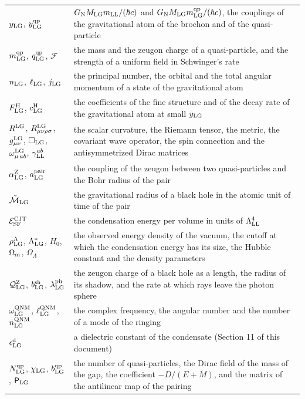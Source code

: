 \documentclass[
  10pt,
]{article}
\begin{document}
\begin{longtable}[]{@{}
  >{\raggedright\arraybackslash}p{}
  >{\raggedright\arraybackslash}p{}@{}}
\(y_{\rm LG}\), \(y^{\rm qp}_{\rm LG}\) &
\(G_{\rm N}M_{\rm LG}m_{\rm LL}/(\hbar c)\) and
\(G_{\rm N}M_{\rm LG}m^{\rm qp}_{\rm LG}/(\hbar c)\), the couplings of
the gravitational atom of the brochon and of the quasi-particle \\
\(m^{\rm qp}_{\rm LG}\), \(q^{\rm qp}_{\rm LG}\), \(\mathcal F\) & the
mass and the zeugon charge of a quasi-particle, and the strength of a
uniform field in Schwinger's rate \\
\(n_{\rm LG}\), \(\ell_{\rm LG}\), \(j_{\rm LG}\) & the principal
number, the orbital and the total angular momentum of a state of the
gravitational atom \\
\(F^{\rm H}_{\rm LG}\), \(c^{\rm H}_{\rm LG}\) & the coefficients of the
fine structure and of the decay rate of the gravitational atom at small
\(y_{\rm LG}\) \\
\(R^{\rm LG}\), \(R^{\rm LG}_{\mu\nu\rho\sigma}\),
\(g^{\rm LG}_{\mu\nu}\), \(\Box_{\rm LG}\),
\(\omega^{\rm LG}_{\mu\,ab}\), \(\gamma^{ab}_{\rm LL}\) & the scalar
curvature, the Riemann tensor, the metric, the covariant wave operator,
the spin connection and the antisymmetrized Dirac matrices \\
\(\alpha^{\rm Z}_{\rm LG}\), \(a^{\rm pair}_{\rm LG}\) & the coupling of
the zeugon between two quasi-particles and the Bohr radius of the
pair \\
\(\tilde{\mathcal M}_{\rm LG}\) & the gravitational radius of a black
hole in the atomic unit of time of the pair \\
\(\mathcal E^{\rm CJT}_{\rm SF}\) & the condensation energy per volume
in units of \(\Lambda_{\rm LL}^4\) \\
\(\rho^\Lambda_{\rm LG}\), \(\Lambda^*_{\rm LG}\), \(H_0\),
\(\Omega_{\rm m}\), \(\Omega_\Lambda\) & the observed energy density of
the vacuum, the cutoff at which the condensation energy has its size,
the Hubble constant and the density parameters \\
\(\mathcal Q^{\rm Z}_{\rm LG}\), \(b^{\rm sh}_{\rm LG}\),
\(\lambda^{\rm ph}_{\rm LG}\) & the zeugon charge of a black hole as a
length, the radius of its shadow, and the rate at which rays leave the
photon sphere \\
\(\omega^{\rm QNM}_{\rm LG}\), \(\ell^{\rm QNM}_{\rm LG}\),
\(n^{\rm QNM}_{\rm LG}\) & the complex frequency, the angular number and
the number of a mode of the ringing \\
\(\epsilon^{\rm d}_{\rm LG}\) & a dielectric constant of the condensate
(Section 11 of this document) \\
\(N^{\rm qp}_{\rm LG}\), \(\chi_{\rm LG}\), \(b^{\rm qp}_{\rm LG}\),
\(\mathsf P_{\rm LG}\) & the number of quasi-particles, the Dirac field
of the mass of the gap, the coefficient \(-D/(E+M)\), and the matrix of
the antilinear map of the pairing \\
\end{longtable}
\end{document}
